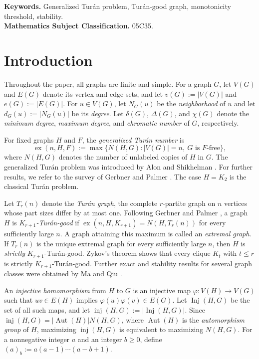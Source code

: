 \documentclass[11pt]{article}
\numberwithin{equation}{section}
\theoremstyle{definition}
\theoremstyle{remark}
\newcommand{\inj}{\operatorname{inj}}
\newcommand{\Inj}{\operatorname{Inj}}
\newcommand{\ex}{\operatorname{ex}}
\newcommand{\Aut}{\operatorname{Aut}}
\begin{document}
\noindent\textbf{Keywords.} Generalized Tur\'an problem, Tur\'an-good graph, monotonicity threshold, stability.\\
\textbf{Mathematics Subject Classification.} 05C35.

\section{Introduction}

Throughout the paper, all graphs are finite and simple. For a graph $G$, let $V(G)$ and $E(G)$ denote its vertex and edge sets, and let $v(G):=|V(G)|$ and $e(G):=|E(G)|$. For $u\in V(G)$, let $N_G(u)$ be the \emph{neighborhood} of $u$ and let $d_G(u):=|N_G(u)|$ be its \emph{degree}. Let $\delta(G)$, $\Delta(G)$, and $\chi(G)$ denote the \emph{minimum degree}, \emph{maximum degree}, and \emph{chromatic number} of $G$, respectively.

For fixed graphs $H$ and $F$, the \emph{generalized Tur\'an number} is
\[
\ex(n,H,F):=\max\{N(H,G):|V(G)|=n,\ G\text{ is }F\text{-free}\},
\]
where $N(H,G)$ denotes the number of unlabeled copies of $H$ in $G$. The generalized Tur\'an problem was introduced by Alon and Shikhelman \cite{AlonShikhelman}. For further results, we refer to the survey of Gerbner and Palmer \cite{GerbnerPalmerSurvey}. The case $H=K_2$ is the classical Tur\'an problem.

Let $T_r(n)$ denote the \emph{Tur\'an graph}, the complete $r$-partite graph on $n$ vertices whose part sizes differ by at most one. Following Gerbner and Palmer \cite{GerbnerPalmerCounting,GerbnerPalmerExact}, a graph $H$ is \emph{$K_{r+1}$-Tur\'an-good} if $\ex(n,H,K_{r+1})=N(H,T_r(n))$ for every sufficiently large $n$. A graph attaining this maximum is called an \emph{extremal graph}. If $T_r(n)$ is the unique extremal graph for every sufficiently large $n$, then $H$ is \emph{strictly} $K_{r+1}$-Tur\'an-good. Zykov's theorem \cite{Zykov} shows that every clique $K_t$ with $t\le r$ is strictly $K_{r+1}$-Tur\'an-good. Further exact and stability results for several graph classes were obtained by Ma and Qiu \cite{MaQiu}.

An \emph{injective homomorphism} from $H$ to $G$ is an injective map $\varphi:V(H)\to V(G)$ such that $uv\in E(H)$ implies $\varphi(u)\varphi(v)\in E(G)$. Let $\Inj(H,G)$ be the set of all such maps, and let $\inj(H,G):=|\Inj(H,G)|$. Since $\inj(H,G)=|\Aut(H)|N(H,G)$, where $\Aut(H)$ is the \emph{automorphism group} of $H$, maximizing $\inj(H,G)$ is equivalent to maximizing $N(H,G)$. For a nonnegative integer $a$ and an integer $b\ge 0$, define $(a)_b:=a(a-1)\cdots(a-b+1)$.
\end{document}
